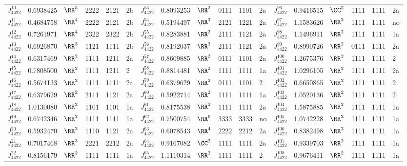\begin{table}[p]
\begin{tabular}{l l l l l l l l l l l l l l l l l l}
 $J^{10}_{4422}$&0.6938425&$\RR^3$&2222&2121&2b&\hphantom{v}$J^{53}_{4422}$&0.8093253&$\RR^2$&0111&1101&2a&\hphantom{v}$J^{96}_{4422}$&0.9416515&$\CC^2$&1111&1111&2a\\
 $J^{11}_{4422}$&0.4684758&$\RR^4$&2222&2121&2b&\hphantom{v}$J^{54}_{4422}$&0.5194497&$\RR^3$&2121&1221&2a&\hphantom{v}$J^{97}_{4422}$&1.1583626&$\RR^2$&1111&1111&no\\
 $J^{12}_{4422}$&0.7261971&$\RR^4$&2322&2322&2b&\hphantom{v}$J^{55}_{4422}$&0.8283881&$\RR^2$&2111&1121&2a&\hphantom{v}$J^{98}_{4422}$&1.1496911&$\RR^2$&1111&1111&1a\\
 $J^{13}_{4422}$&0.6926870&$\RR^3$&1121&1111&2b&\hphantom{v}$J^{56}_{4422}$&0.8192037&$\RR^3$&2111&1121&2a&\hphantom{v}$J^{99}_{4422}$&0.8990726&$\RR^2$&0111&1111&2a\\
 $J^{14}_{4422}$&0.6317469&$\RR^2$&1111&1211&2a&\hphantom{v}$J^{57}_{4422}$&0.8609885&$\RR^2$&0111&1101&2a&\hphantom{v}$J^{100}_{4422}$&1.2675376&$\RR^2$&1111&1111&2\\
 $J^{15}_{4422}$&0.7808500&$\RR^2$&1111&1211&2&\hphantom{v}$J^{58}_{4422}$&0.8814481&$\RR^2$&1111&1111&1a&\hphantom{v}$J^{101}_{4422}$&1.0296105&$\RR^2$&1111&1111&2a\\
 $J^{16}_{4422}$&0.5674133&$\RR^2$&1111&1111&2a&\hphantom{v}$J^{59}_{4422}$&0.6379629&$\RR^2$&0111&1101&2&\hphantom{v}$J^{102}_{4422}$&0.6650865&$\RR^2$&1111&1111&2\\
 $J^{17}_{4422}$&0.6379629&$\RR^2$&2111&1121&2a&\hphantom{v}$J^{60}_{4422}$&0.5922714&$\RR^2$&1111&1111&1a&\hphantom{v}$J^{103}_{4422}$&1.0520136&$\RR^2$&1111&1111&2\\
 $J^{18}_{4422}$&1.0130080&$\RR^2$&1101&1101&1a&\hphantom{v}$J^{61}_{4422}$&0.8175538&$\RR^2$&1111&1111&2a&\hphantom{v}$J^{104}_{4422}$&1.5875885&$\RR^2$&1111&1111&1a\\
 $J^{19}_{4422}$&0.6742346&$\RR^2$&1111&1111&1a&\hphantom{v}$J^{62}_{4422}$&0.7500754&$\RR^6$&3333&3333&no&\hphantom{v}$J^{105}_{4422}$&1.0742228&$\RR^2$&1111&1111&1a\\
 $J^{20}_{4422}$&0.5932470&$\RR^2$&1110&1121&2a&\hphantom{v}$J^{63}_{4422}$&0.6078543&$\RR^4$&2222&2212&2a&\hphantom{v}$J^{106}_{4422}$&0.8382498&$\RR^2$&1111&1111&1a\\
 $J^{21}_{4422}$&0.7017468&$\RR^3$&2221&2212&2a&\hphantom{v}$J^{64}_{4422}$&0.9167082&$\CC^2$&1111&1111&2a&\hphantom{v}$J^{107}_{4422}$&0.9339703&$\RR^2$&1111&1111&1a\\
 $J^{22}_{4422}$&0.8156179&$\RR^2$&1111&1111&1a&\hphantom{v}$J^{65}_{4422}$&1.1110314&$\RR^2$&1111&1111&2&\hphantom{v}$J^{108}_{4422}$&0.9676411&$\RR^2$&1111&1111&1a\\

\end{tabular}
\end{table}
